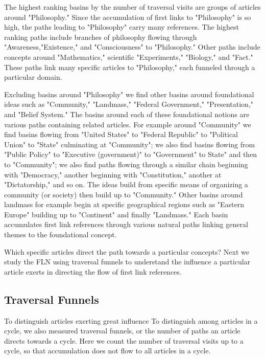 \documentclass[pre,twocolumn,twoside,superscriptaddress,floatfix, aps, 10pt]{revtex4-1}
\begin{document}
The highest ranking basins by the number of traversal visits are groups of articles
around "Philosophy." 
Since the accumulation of first links to "Philosophy" is so high, 
the paths leading to "Philosophy" carry many references.
The highest ranking paths include branches of philosophy flowing through 
"Awareness,"Existence," and "Consciousness" to "Philosophy." Other paths
include concepts around "Mathematics," scientific "Experiments," 
"Biology," and "Fact."
These paths link many specific articles to "Philosophy," each funneled through a particular domain.

Excluding basins around "Philosophy" we find other basins around 
foundational ideas such as "Community," "Landmass," "Federal Government," 
"Presentation," and "Belief System." 
The basins around each of these foundational notions are 
various paths containing related articles. For example around 
"Community" we find basins
flowing from "United States" to "Federal Republic" to "Political Union" to "State" culminating at "Community"; we also find basins flowing from 
"Public Policy" to "Executive (government)" to "Government" to State" and then 
to "Community"; we also find paths flowing through a similar chain beginning
with "Democracy," another beginning with "Constitution," another at 
"Dictatorship," and so on. The ideas build from specific means of organizing
a community (or society) then build up to "Community." 
Other basins around landmass for example begin at specific geographical regions
such as "Eastern Europe" building up to "Continent" and finally "Landmass."
Each basin accumulates first link references through various 
natural paths linking general themes to the foundational concept.

Which specific articles direct the path towards a particular concepts? 
Next we study the FLN using traversal funnels to understand the influence
a particular article exerts in directing the flow of first link references.


\subsection{Traversal Funnels}


To distinguish articles exerting great influence 
To distinguish among articles in a cycle, we also measured traversal funnels, or the number of 
paths an article directs towards a cycle. Here we count the number of traversal visits up to a cycle, 
so that accumulation does not flow to all articles in a cycle.
\end{document}
